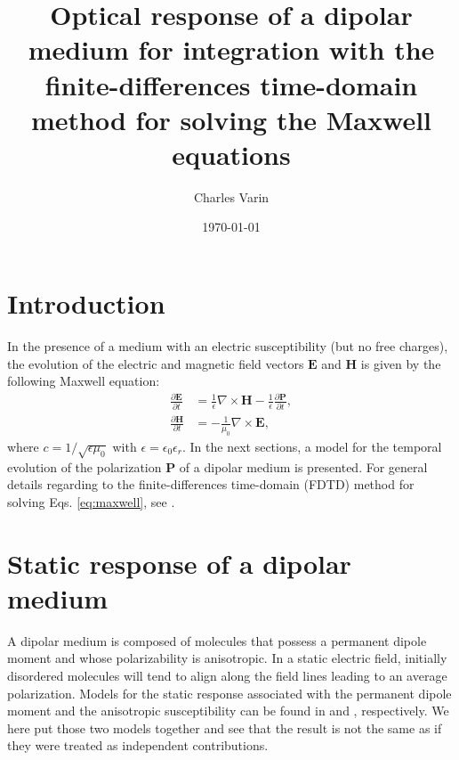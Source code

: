 \documentclass[12pt,letterpaper]{article}
\date{\today}
\author{Charles Varin}
\title{Optical response of a dipolar medium for integration with the finite-differences time-domain method for solving the Maxwell equations}
\begin{document}
\maketitle 
\tableofcontents
\section{Introduction}\label{intro}
In the presence of a medium with an electric susceptibility (but no free charges), the evolution of the electric and magnetic field vectors $\mathbf{E}$ and $\mathbf{H}$ is given by the following Maxwell equation:
\begin{subequations}\label{eq:maxwell}
  \begin{align}\label{eq:maxwell1}
   \frac{\partial\mathbf{E}}{\partial t} &=\frac{1}{\epsilon}\nabla\times\mathbf{H}-\frac{1}{\epsilon}\frac{\partial\mathbf{P}}{\partial t},\\
   \frac{\partial\mathbf{H}}{\partial t} &=-\frac{1}{\mu_0}\nabla\times\mathbf{E},\label{eq:maxwell2}
  \end{align}
\end{subequations}
where $c = 1/\sqrt{\epsilon\mu_0}$ with $\epsilon = \epsilon_0\epsilon_r$. In the next sections, a model for the temporal evolution of the polarization $\mathbf{P}$ of a dipolar medium is presented. For general details regarding to the finite-differences time-domain (FDTD) method for solving Eqs. \eqref{eq:maxwell}, see \cite{sullivan2000,taflove2005}.

\section{Static response of a dipolar medium}\label{static}
A dipolar medium is composed of molecules that possess a permanent dipole moment and whose polarizability is anisotropic. In a static electric field, initially disordered molecules will tend to align along the field lines leading to an average polarization. Models for the static response associated with the permanent dipole moment and the anisotropic susceptibility can be found in \cite{jackson1999,hook1991} and \cite{boyd2008}, respectively. We here put those two models together and see that the result is not the same as if they were treated as independent contributions. 
\end{document}
